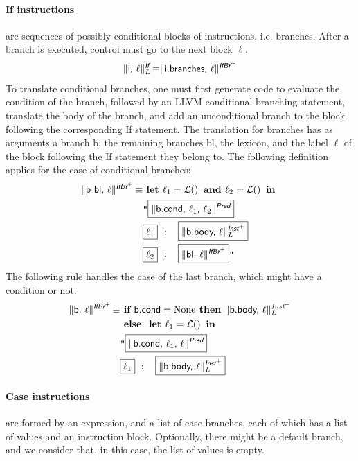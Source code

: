 \documentclass{llncs}
\newcommand{\trad}[2]{\ensuremath{\lVert \textsf{#1} \rVert^{\textit{#2}}}}
\DeclareMathOperator{\isdef}{\equiv}
\DeclareMathOperator{\lbl}{\mathcal{L}()}
\newcommand{\llvm}[1]{\texttt{#1}}
\newcommand{\B}[1]{\textsf{#1}}
\newcommand{\ListOf}[1]{$\mbox{#1}^+$}
\newcommand{\IF}[0]{\textbf{ if }}
\newcommand{\ELSE}[0]{\textbf{ else }}
\newcommand{\THEN}[0]{\textbf{ then }}
\newcommand{\LET}[0]{\textbf{ let }}
\newcommand{\IN}[0]{\textbf{ in }}
\newcommand{\AND}[0]{\textbf{ and }}
\newcommand{\PH}[1]{\framebox{$#1$}}
\begin{document}
\paragraph{If instructions} are sequences of possibly conditional blocks of
instructions, i.e. branches. After a branch is executed, control must go
to the next block $\ell$.
\begin{align*}
  \trad{i, $\ell$}{\B{If}}_L \isdef \trad{i.branches, $\ell$}{\ListOf{\B{IfBr}}}
\end{align*}
To translate conditional branches, one must first generate code to evaluate the
condition of the branch, followed by an LLVM conditional branching statement,
translate the body of the branch, and add an unconditional branch to the block
following the corresponding \B{If} statement.  The translation for branches has
as arguments a branch \B{b}, the remaining branches \B{bl}, the lexicon, and the
label $\ell$ of the block following the \B{If} statement they belong to. The
following definition applies for the case of conditional branches:
\begin{align*}
\begin{split}
  \trad{\B{b bl}, $\ell$}{\ListOf{\B{IfBr}}} \isdef & \LET \ell_1 = \lbl \AND \ell_2 = \lbl \IN \\
  & \llvm{"\PH{\trad{b.cond, $\ell_1$, $\ell_2$}{\B{Pred}}} } \\
  & \llvm{\PH{\ell_1} : \PH{\trad{b.body, $\ell$}{\ListOf{\B{Inst}}}_L}} \\
  & \llvm{\PH{\ell_2} : \PH{\trad{bl, $\ell$}{\ListOf{\B{IfBr}}}}"} \\
\end{split}
\end{align*}
The following rule handles the case of the last branch, which might have a condition or not:
\begin{align*}
\begin{split}
  \trad{\B{b}, $\ell$}{\ListOf{\B{IfBr}}} \isdef & \IF \B{b.cond} = \text{None} \THEN
  \trad{b.body, $\ell$}{\ListOf{Inst}}_L\\
  & \ELSE \LET \ell_1 = \lbl \IN \\
  & \llvm{"\PH{\trad{b.cond, $\ell_1$, $\ell$}{\B{Pred}}} } \\
  & \llvm{\PH{\ell_1} : \PH{\trad{b.body, $\ell$}{\ListOf{\B{Inst}}}_L}}
\end{split}
\end{align*}

\paragraph{Case instructions} are formed by an expression, and a list of case
branches, each of which has a list of values and an instruction block.
Optionally, there might be a default branch, and we consider that, in this case,
the list of values is empty. 
\end{document}
